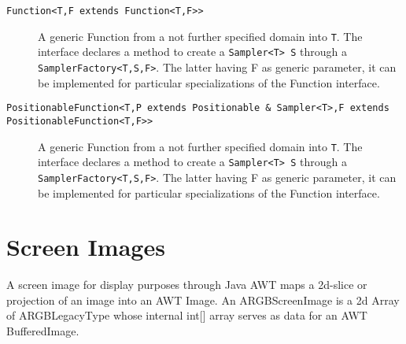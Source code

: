 \documentclass[a4paper,10pt]{report}
\begin{document}
\begin{description}
	\item[{\tt{}Function<T,F extends Function<T,F>>}]{A generic Function from a not further specified domain into {\tt{}T}.  The interface declares a method to create a {\tt{Sampler<T> S}} through a {\tt{SamplerFactory<T,S,F>}}.  The latter having F as generic parameter, it can be implemented for particular specializations of the Function interface.}
	\item[{\tt{}PositionableFunction<T,P extends Positionable \& Sampler<T>,F extends PositionableFunction<T,F>>}]{A generic Function from a not further specified domain into {\tt{}T}.  The interface declares a method to create a {\tt{Sampler<T> S}} through a {\tt{SamplerFactory<T,S,F>}}.  The latter having F as generic parameter, it can be implemented for particular specializations of the Function interface.}
\end{description}

\section{Screen Images}
A screen image for display purposes through Java AWT maps a 2d-slice or projection of an image into an AWT Image.  An ARGBScreenImage is a 2d Array of ARGBLegacyType whose internal int[] array serves as data for an AWT BufferedImage.
\end{document}
